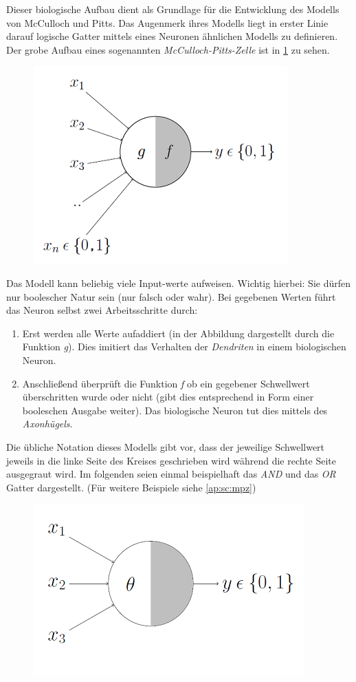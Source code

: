 Dieser biologische Aufbau dient als Grundlage für die Entwicklung des Modells von McCulloch und Pitts. Das Augenmerk ihres Modells liegt in erster Linie darauf logische Gatter mittels eines Neuronen ähnlichen Modells zu definieren. Der grobe Aufbau eines sogenannten \emph{McCulloch-Pitts-Zelle} ist in \ref{fig:mpn_aufbau} zu sehen. 


\begin{figure}[!htb]
	\centering
	\includegraphics[width=.5\linewidth]{img/aufbau}
	\label{fig:mpn_aufbau}
\end{figure}

Das Modell kann beliebig viele Input-werte aufweisen. Wichtig hierbei: Sie dürfen nur boolescher Natur sein (nur falsch oder wahr). Bei gegebenen Werten führt das Neuron selbst zwei Arbeitsschritte durch: 
\begin{enumerate}

\item Erst werden alle Werte aufaddiert (in der Abbildung dargestellt durch die Funktion \emph{g}). Dies imitiert das Verhalten der \emph{Dendriten} in einem biologischen Neuron. 

\item Anschließend überprüft die Funktion \emph{f} ob ein gegebener Schwellwert überschritten wurde oder nicht (gibt dies entsprechend in Form einer booleschen Ausgabe weiter). Das biologische Neuron tut dies mittels des \emph{Axonhügels}. 

\end{enumerate}

Die übliche Notation dieses Modells gibt vor, dass der jeweilige Schwellwert jeweils in die linke Seite des Kreises geschrieben wird während die rechte Seite ausgegraut wird. Im folgenden seien einmal beispielhaft das \emph{AND} und das \emph{OR} Gatter dargestellt. (Für weitere Beispiele siehe \autoref{ap:sc:mpz})

\begin{figure}[!htb]
	\centering
	\includegraphics[width=.5\linewidth]{img/aufbau2}
	\label{fig:bioNeuron_notation}
\end{figure}

